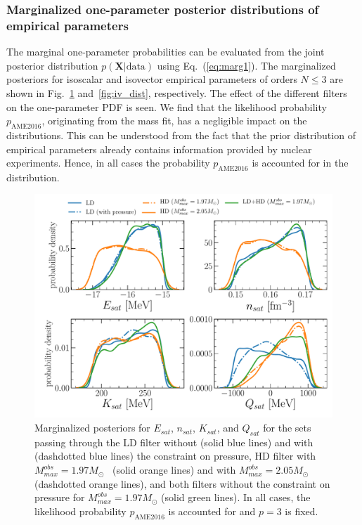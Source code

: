 \subsubsection{Marginalized one-parameter posterior distributions of empirical
parameters}\label{subsubsec:marg}


The marginal one-parameter probabilities can be evaluated from the joint
posterior distribution $p(\bm{X}|\text{data})$ using Eq.~(\ref{eq:marg1}).
The marginalized posteriors for isoscalar and isovector empirical parameters of 
orders $N\leq 3$ are shown in Fig.~\ref{fig:is_dist} and~\ref{fig:iv_dist},
respectively. The effect of the different filters on the one-parameter PDF is
seen. We find that the likelihood probability $p_{\text{AME2016}}$,
originating from the mass fit, has a negligible impact on the distributions.
This can be understood from the fact that the prior distribution of empirical
parameters already contains information provided by nuclear experiments. Hence, 
in all cases the probability $p_{\text{AME2016}}$ is accounted for in the 
distribution.

\begin{figure}[!t]
\begin{center}
  \includegraphics[width=1.0\linewidth]{figures/is_dist.pdf}
\end{center}
\caption[Marginalized posteriors for isoscalar empirical parameters assuming
different filters]{Marginalized posteriors for $E_{sat}$, $n_{sat}$, $K_{sat}$, 
and $Q_{sat}$ for the sets passing through the LD filter without (solid blue
lines) and with (dashdotted blue lines) the constraint on pressure, HD
filter with $M_{max}^{obs}=1.97M_\odot$~\cite{Antoniadis2013} (solid orange
lines) and with $M_{max}^{obs}=2.05M_\odot$~\cite{Cromartie2020}
(dashdotted orange lines), and both filters without the constraint on 
pressure for $M_{max}^{obs}=1.97M_\odot$ (solid green lines). In all cases, 
the likelihood probability $p_{\text{AME2016}}$ is accounted for and $p=3$ is 
fixed.}\label{fig:is_dist}
\end{figure}
 
